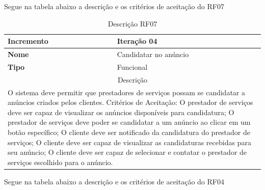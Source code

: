 \clearpage
Segue na tabela abaixo a descrição e os critérios de aceitação do RF07
\begin{table}[htb]
	\centering
	\caption{\label{Formatação do texto.}Descrição RF07}	
	\begin{tabular}{|l|p{11cm}|}
		\hline
		\textbf{Incremento}    & Iteração 04\\ \hline
		\textbf{Nome}    & Candidatar no anúncio\\ \hline
		\textbf{Tipo}    & Funcional\\ \hline
		\multicolumn{2}{|c|}{Descrição}\\ \hline
		\multicolumn{2}{|p{12cm}|}{
			O sistema deve permitir que prestadores de serviços possam se candidatar a anúncios criados pelos clientes. \newline
			\newline Critérios de Aceitação: \newline
			O prestador de serviços deve ser capaz de visualizar os anúncios disponíveis para candidatura; \newline
            O prestador de serviços deve poder se candidatar a um anúncio ao clicar em um botão específico; \newline
			O cliente deve ser notificado da candidatura do prestador de serviços; \newline
			O cliente deve ser capaz de visualizar as candidaturas recebidas para seu anúncio; \newline
			O cliente deve ser capaz de selecionar e contatar o prestador de serviços escolhido para o anúncio.
			} \\ \hline
	\end{tabular}
\end{table}


\clearpage
Segue na tabela abaixo a descrição e os critérios de aceitação do RF04

